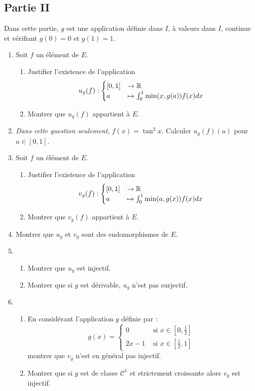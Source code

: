 \subsection*{Partie II}
Dans cette partie, $g$ est une application définie dans $I$, à valeurs dans $I$, continue et vérifiant $g(0)=0$ et $g(1)=1$.
\begin{enumerate}
 \item Soit $f$  un élément de $E$.
\begin{enumerate}
 \item Justifier l'existence de l'application 
\begin{displaymath}
u_g(f) : \begin{cases}[0,1] &\rightarrow \mathbb{R} \\ a &\mapsto \int _{0}^1 \min(x,g(a))f(x)dx \end{cases}
\end{displaymath}
\item Montrer que $u_g(f)$ appartient à $E$.
\end{enumerate}
\item \emph{Dans cette question seulement}, $f(x)=\tan^2 x$. Calculer $u_g(f)(a)$ pour $a\in[0,1]$.
 \item Soit $f$  un élément de $E$.
\begin{enumerate}
 \item Justifier l'existence de l'application 
\begin{displaymath}
v_g(f) : \begin{cases}[0,1] &\rightarrow \mathbb{R} \\ a &\mapsto \int _{0}^1 \min(a,g(x))f(x)dx \end{cases}
\end{displaymath}
\item Montrer que $v_g(f)$ appartient à $E$.
\end{enumerate}
\item Montrer que $u_g$ et $v_g$ sont des endomorphismes de $E$.
\item \begin{enumerate}
 \item Montrer que $u_g$ est injectif.
\item Montrer que si $g$ est dérivable, $u_g$ n'est pas surjectif.
\end{enumerate}
\item \begin{enumerate}
 \item En considérant l'application $g$ définie par :
\begin{displaymath}
 g(x)=\begin{cases}
       0 &\text{ si } x\in [0,\frac{1}{2}] \\
2x-1 &\text{ si } x\in [\frac{1}{2},1]
      \end{cases}
\end{displaymath}
montrer que $v_g$ n'est en général pas injectif.
\item Montrer que si $g$ est de classe $\mathcal C ^1$ et strictement croissante alors $v_g$ est injectif.
\end{enumerate}

\end{enumerate}
